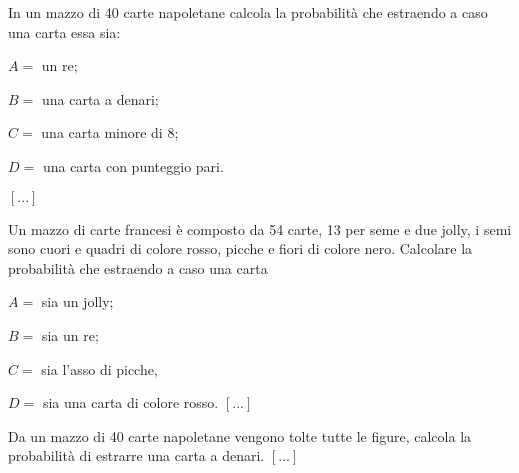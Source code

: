 \begin{esercizio}
 \label{ese:9.20}
 In un mazzo di 40 carte napoletane calcola la probabilità che estraendo a caso 
una carta essa sia:
\begin{multicols}{2}
\begin{itemize*}
\item $ A= $ un re;
\item $ B= $ una carta a denari;
\item $ C= $ una carta minore di 8;
\item $ D = $ una carta con punteggio pari.
\end{itemize*}
\end{multicols}
\hfill $\left[...\right]$
\end{esercizio}

\begin{esercizio}
 \label{ese:9.21}
Un mazzo di carte francesi è composto da 54 carte, 13 per seme e due jolly, i 
semi sono cuori e quadri di colore rosso, picche e fiori di colore nero. 
Calcolare la probabilità che estraendo a caso una carta
\begin{multicols}{2}
\begin{itemize*}
\item $ A= $ sia un jolly;
\item $ B= $ sia un re;
\item $ C= $ sia l'asso di picche,
\item $ D= $ sia una carta di colore rosso.
\hfill $\left[...\right]$
\end{itemize*}
\end{multicols}
\end{esercizio}

\begin{esercizio}
 \label{ese:9.22}
Da un mazzo di 40 carte napoletane vengono tolte tutte le figure, calcola la 
probabilità di estrarre una carta a denari.
\hfill $\left[...\right]$
\end{esercizio}


